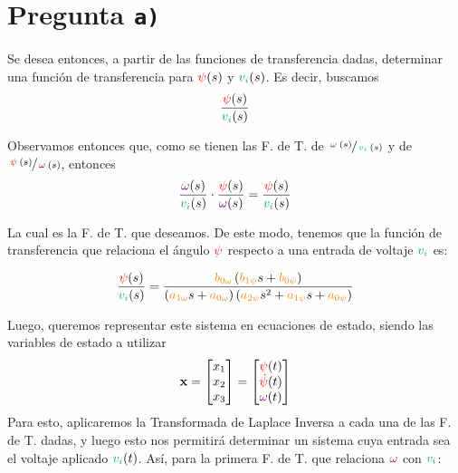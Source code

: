 \section{Pregunta \texttt{a)}}\label{pregunta-a}

Se desea entonces, a partir de las funciones de transferencia dadas, determinar
una función de transferencia para $\mathbin{\color{red}\psi} (s)$ y $\verd{v_{i}} (s)$. Es decir, buscamos
\begin{equation}
  \frac{\rojo{\psi} (s)}{\verd{v_{i}} (s)}
  \label{eq:fdt-1}
\end{equation}

Observamos entonces que, como se tienen las F. de T. de $\sfrac{\mora{\omega}(s)}{\verd{v_{i}} (s)}$
y de $\sfrac{\mathbin{\color{red}\psi}(s)}{\mathbin{\color{violet}\omega}(s)}$, entonces
\begin{equation}
  \frac{\mora{\omega} (s)}{\verd{v_{i}} (s)} \cdot \frac{\rojo{\psi} (s)}{\mora{\omega} (s)} = \frac{\rojo{\psi} (s)}{\verd{v_{i}} (s)}
\end{equation}

La cual es la F. de T. que deseamos. De este modo, tenemos que la función de
transferencia que relaciona el ángulo $\mathbin{\color{red}\psi}$ respecto a una entrada de voltaje
$\verd{v_{i}}$ es:

\begin{equation}
  \frac{\rojo{\psi} (s)}{\verd{v_{i}} (s)} =
    \frac{\nara{\nara{b_{0\omega}}}\left(\nara{b_{1\psi}}s + \nara{b_{0\psi}}\right)}
    {\left(\nara{a_{1\omega}}s + \nara{a_{0\omega}}\right)\left(\nara{a_{2\psi}}s^{2} + \nara{a_{1\psi}}s + \nara{a_{0\psi}}\right)}
  \label{eq:fdt-2}
\end{equation}

Luego, queremos representar este sistema en ecuaciones de estado, siendo las
variables de estado a utilizar
\begin{equation}
  \mathbf{x} = \begin{bmatrix}x_{1} \\ x_{2} \\ x_{3}\end{bmatrix}
    = \begin{bmatrix}\mathbin{\color{red}\psi} (t) \\ \mathbin{\color{red}\dot\psi} (t) \\ \mathbin{\color{violet}\omega} (t) \end{bmatrix}
  \label{eq:var-estado}
\end{equation}
Para esto, aplicaremos la Transformada de Laplace Inversa a cada una de las
F. de T. dadas, y luego esto nos permitirá determinar un sistema cuya entrada
sea el voltaje aplicado $\verd{v_{i}} (t)$. Así, para la primera F. de T. que relaciona
$\mathbin{\color{violet}\omega}$ con $\verd{v_{i}}$:

